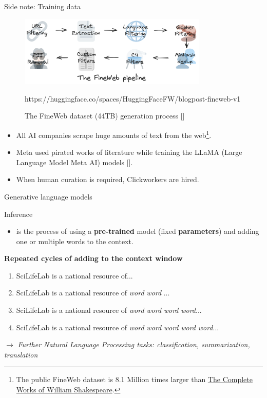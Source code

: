\documentclass[10pt]{beamer}
\newcommand{\credit}[1]{{\par \raggedleft \scriptsize \mdseries \color{mDarkBrown} #1 \par}}
\newcommand{\citeme}[1]{{\xspace\color{scAqua} \scriptsize [\cite{#1}]}}
\newcommand{\feature}[1]{{\color{scLime} \textbf{#1}}}
\newcommand{\remark}[1]{{\par \color{scGrape} \ensuremath{\rightarrow} \emph{#1}}}
\begin{document}
\begin{frame}{Side note: Training data}
	\begin{figure}
		\includegraphics[width=0.8\textwidth]{figures/dist_assets_images_fineweb-recipe.png}
		\caption{The FineWeb dataset (44TB) generation process\citeme{Penedo2024}}
		\credit{https://huggingface.co/spaces/HuggingFaceFW/blogpost-fineweb-v1}
	\end{figure}
	\begin{itemize}
		\item All AI companies scrape huge amounts of text from the web\footnote{The public FineWeb dataset is 8.1 Million times larger than \href{https://www.gutenberg.org/ebooks/100}{The Complete Works of William Shakespeare}.}.
		\item Meta used pirated works of literature while training the LLaMA (Large Language Model Meta AI) models\citeme{Belanger2025}.
		\item When human curation is required, Clickworkers are hired.
	\end{itemize}
\end{frame}

\begin{frame}{Generative language models}
	\begin{exampleblock}{Inference}
		\begin{itemize}
			\item is the process of using a \feature{pre-trained} model (fixed \feature{parameters}) and adding one or multiple words to the context.
		\end{itemize}
	\end{exampleblock}
	\textbf{Repeated cycles of adding to the \feature{context window}}
	\begin{enumerate}
		\item SciLifeLab is a national resource of...
		\item SciLifeLab is a national resource of \emph{word} \emph{word} ...
		\item SciLifeLab is a national resource of \emph{word} \emph{word} \emph{word} \emph{word}...
		\item SciLifeLab is a national resource of \emph{word} \emph{word} \emph{word} \emph{word} \emph{word}...
	\end{enumerate}
\remark{Further Natural Language Processing tasks: classification, summarization, translation}
\end{frame}
\end{document}
